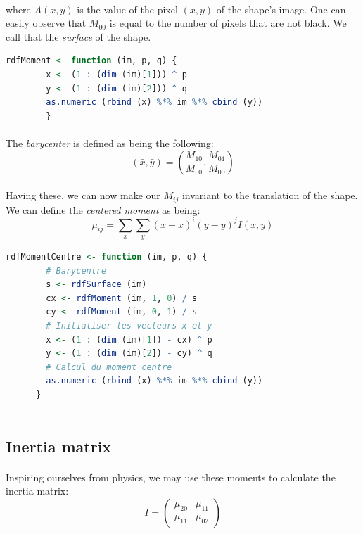 \paragraph{}
where $A(x, y)$ is the value of the pixel $(x, y)$ of the shape's image. One can easily observe that $M_{00}$ is equal to the number of pixels that are not black. We call that the \emph{surface} of the shape.

\begin{lstlisting}[language=R, caption=Calculating the moment of a shape]
    rdfMoment <- function (im, p, q) {
        x <- (1 : (dim (im)[1])) ^ p
        y <- (1 : (dim (im)[2])) ^ q
        as.numeric (rbind (x) %*% im %*% cbind (y))
        }
\end{lstlisting}

\paragraph{}
The \emph{barycenter} is defined as being the following:
$$(\bar{x}, \bar{y}) = (\frac{M_{10}} {M_{00}}, \frac{M_{01}} {M_{00}})$$

\paragraph{}
Having these, we can now make our $M_{ij}$ invariant to the translation of the shape. We can define the \emph{centered moment} as being:
$$\mu_{ij} = \sum_{x}\sum_{y} (x - \bar{x})^i(y - \bar{y})^j I(x, y)$$

\begin{lstlisting}[language=R, caption=Calculating centered moments]
    rdfMomentCentre <- function (im, p, q) {
        # Barycentre
        s <- rdfSurface (im)
        cx <- rdfMoment (im, 1, 0) / s
        cy <- rdfMoment (im, 0, 1) / s
        # Initialiser les vecteurs x et y
        x <- (1 : (dim (im)[1]) - cx) ^ p
        y <- (1 : (dim (im)[2]) - cy) ^ q
        # Calcul du moment centre
        as.numeric (rbind (x) %*% im %*% cbind (y))
      }
      
\end{lstlisting}

\subsection{Inertia matrix}
\paragraph{}
Inspiring ourselves from physics, we may use these moments to calculate the inertia matrix:
$$ I = 
\begin{pmatrix}
    \mu_{20} & \mu_{11}\\
    \mu_{11} & \mu_{02}
\end{pmatrix}
$$


